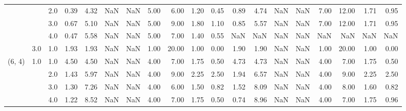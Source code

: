 \begin{tabular}{lllrrrrrrrrrrrrrrrr}
       &     & 2.0  &      0.39 &       4.32 &               NaN &                NaN & 5.00 &   6.00 &             1.20 &                         0.45 &      0.89 &       4.74 &               NaN &                NaN & 7.00 &  12.00 &             1.71 &                         0.95 \\
       &     & 3.0  &      0.67 &       5.10 &               NaN &                NaN & 5.00 &   9.00 &             1.80 &                         1.10 &      0.85 &       5.57 &               NaN &                NaN & 7.00 &  12.00 &             1.71 &                         0.95 \\
       &     & 4.0  &      0.47 &       5.58 &               NaN &                NaN & 5.00 &   7.00 &             1.40 &                         0.55 &       NaN &        NaN &               NaN &                NaN &  NaN &    NaN &              NaN &                          NaN \\
       & 3.0 & 1.0  &      1.93 &       1.93 &               NaN &                NaN & 1.00 &  20.00 &             1.00 &                         0.00 &      1.90 &       1.90 &               NaN &                NaN & 1.00 &  20.00 &             1.00 &                         0.00 \\
(6, 4) & 1.0 & 1.0  &      4.50 &       4.50 &               NaN &                NaN & 4.00 &   7.00 &             1.75 &                         0.50 &      4.73 &       4.73 &               NaN &                NaN & 4.00 &   7.00 &             1.75 &                         0.50 \\
       &     & 2.0  &      1.43 &       5.97 &               NaN &                NaN & 4.00 &   9.00 &             2.25 &                         2.50 &      1.94 &       6.57 &               NaN &                NaN & 4.00 &   9.00 &             2.25 &                         2.50 \\
       &     & 3.0  &      1.30 &       7.26 &               NaN &                NaN & 4.00 &   6.00 &             1.50 &                         0.82 &      1.52 &       8.09 &               NaN &                NaN & 4.00 &   8.00 &             1.60 &                         0.82 \\
       &     & 4.0  &      1.22 &       8.52 &               NaN &                NaN & 4.00 &   7.00 &             1.75 &                         0.50 &      0.74 &       8.96 &               NaN &                NaN & 4.00 &   7.00 &             1.75 &                         0.96 \\

\end{tabular}
